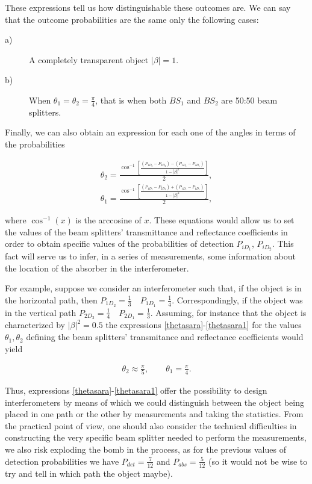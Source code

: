 \documentclass[12pt]{book}
\begin{document}
These expressions tell us how distinguishable these outcomes are.  We can say that the outcome probabilities are the same only the following cases:

\begin{description}

\item[a)] A completely transparent object $|\beta|=1$.

\item[b)] When $\theta_{1}=\theta_{2}=\frac{\pi}{4}$, that is when both $BS_{1}$ and $BS_{2}$ are 50:50 beam splitters.
\end{description}

Finally, we can also obtain an expression for each one of the angles in terms of the probabilities


\begin{align}
\theta_{2}=\displaystyle \frac{\cos^{-1}\left[\frac{(P_{1D_{2}}-P_{2D_{2}})-(P_{1D_{1}}-P_{2D_{1}})}{1-|\beta|^2}\right]}{2},\label{thetasara}\\
\theta_{1}=\displaystyle \frac{\cos^{-1}\left[\frac{(P_{1D_{2}}-P_{2D_{2}})+(P_{1D_{1}}-P_{1D_{1}})}{1-|\beta|^2}\right]}{2}\label{thetasara1},
\end{align}


where $\cos^{-1}(x)$ is the arccosine of $x$. These equations would allow us to set the values of the beam splitters' transmittance and reflectance coefficients in order to obtain specific values of the probabilities of detection $P_{iD_{1}}$, $P_{iD_{2}}$. This fact will serve us to infer, in a series of measurements, some information about the location of the absorber in the interferometer.  

For example, suppose we consider an interferometer such that, if the object is in the horizontal path, then $P_{1D_{2}}=\frac{1}{3} \quad P_{1D_{1}}=\frac{1}{4}$. Correspondingly,  if the object was in the vertical path $P_{2D_{2}}=\frac{1}{4} \quad P_{2D_{1}}=\frac{1}{3}$. Assuming, for instance that the object is characterized by $|\beta|^{2}=0.5$ the expressions \ref{thetasara}-\ref{thetasara1} for the values $\theta_{1},\theta_{2}$ defining the beam splitters' transmitance and reflectance coefficients would yield

\begin{align*}
\theta_{2} \approx \frac{\pi}{5},\qquad \theta_{1} = \frac{\pi}{4}.
\end{align*}

Thus, expressions \ref{thetasara}-\ref{thetasara1} offer the possibility to design interferometers by means of which we could distinguish between the object being placed in one path or the other by measurements and taking the statistics. From the practical point of view, one should also consider the technical difficulties in constructing the very specific beam splitter needed to perform the measurements, we also risk exploding the bomb in the process, as for the previous values of detection probabilities we have $P_{det}=\frac{7}{12}$ and $P_{abs}=\frac{5}{12}$ (so it would not be wise to try and tell in which path the object maybe).
 
\end{document}
